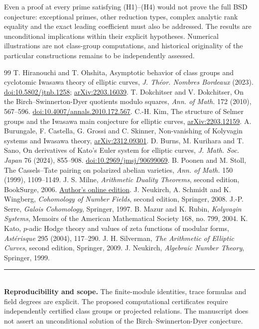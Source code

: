 \documentclass[11pt,a4paper]{article}
\theoremstyle{definition}\newtheorem{definition}[theorem]{Definition}
\theoremstyle{remark}\newtheorem{remark}[theorem]{Remark}
\numberwithin{equation}{section}
\begin{document}
Even a proof at every prime satisfying (H1)--(H4) would not prove the full BSD conjecture: exceptional primes, other reduction types, complex analytic rank equality and the exact leading coefficient must also be addressed. The results are unconditional implications within their explicit hypotheses. Numerical illustrations are not class-group computations, and historical originality of the particular constructions remains to be independently assessed.
\clearpage
\begin{thebibliography}{99}
 T. Hiranouchi and T. Ohshita, Asymptotic behavior of class groups and cyclotomic Iwasawa theory of elliptic curves, \emph{J. Th\'{e}or. Nombres Bordeaux} (2023). \href{https://doi.org/10.5802/jtnb.1258}{doi:10.5802/jtnb.1258}; \href{https://arxiv.org/abs/2203.16039}{arXiv:2203.16039}.
 T. Dokchitser and V. Dokchitser, On the Birch--Swinnerton-Dyer quotients modulo squares, \emph{Ann. of Math.} 172 (2010), 567--596. \href{https://doi.org/10.4007/annals.2010.172.567}{doi:10.4007/annals.2010.172.567}.
 C.-H. Kim, The structure of Selmer groups and the Iwasawa main conjecture for elliptic curves, \href{https://arxiv.org/abs/2203.12159}{arXiv:2203.12159}.
 A. Burungale, F. Castella, G. Grossi and C. Skinner, Non-vanishing of Kolyvagin systems and Iwasawa theory, \href{https://arxiv.org/abs/2312.09301}{arXiv:2312.09301}.
 D. Burns, M. Kurihara and T. Sano, On derivatives of Kato's Euler system for elliptic curves, \emph{J. Math. Soc. Japan} 76 (2024), 855--908. \href{https://doi.org/10.2969/jmsj/90699069}{doi:10.2969/jmsj/90699069}.
 B. Poonen and M. Stoll, The Cassels--Tate pairing on polarized abelian varieties, \emph{Ann. of Math.} 150 (1999), 1109--1149.
 J. S. Milne, \emph{Arithmetic Duality Theorems}, second edition, BookSurge, 2006. \href{https://www.jmilne.org/math/Books/ADT.html}{Author's online edition}.
 J. Neukirch, A. Schmidt and K. Wingberg, \emph{Cohomology of Number Fields}, second edition, Springer, 2008.
 J.-P. Serre, \emph{Galois Cohomology}, Springer, 1997.
 B. Mazur and K. Rubin, \emph{Kolyvagin Systems}, Memoirs of the American Mathematical Society 168, no. 799, 2004.
 K. Kato, $p$-adic Hodge theory and values of zeta functions of modular forms, \emph{Ast\'{e}risque} 295 (2004), 117--290.
 J. H. Silverman, \emph{The Arithmetic of Elliptic Curves}, second edition, Springer, 2009.
 J. Neukirch, \emph{Algebraic Number Theory}, Springer, 1999.
\end{thebibliography}
\vfill
\noindent\textcolor{teal}{\rule{\textwidth}{0.5pt}}\\[-2pt]
\small\textbf{Reproducibility and scope.} The finite-module identities, trace formulas and field degrees are explicit. The proposed computational certificates require independently certified class groups or projected relations. The manuscript does not assert an unconditional solution of the Birch--Swinnerton-Dyer conjecture.
\end{document}
